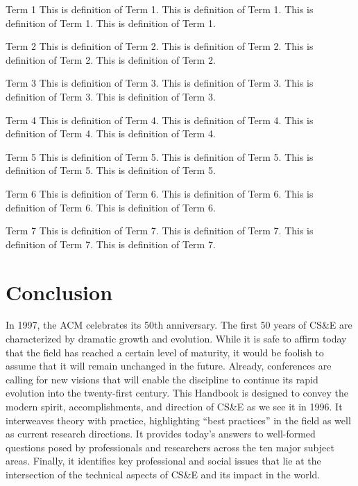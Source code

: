 \begin{gloss}
\item[Term 1]
This is definition of Term 1.
This is definition of Term 1.
This is definition of Term 1.
This is definition of Term 1.
\item[Term 2]
This is definition of Term 2.
This is definition of Term 2.
This is definition of Term 2.
This is definition of Term 2.
\item[Term 3]
This is definition of Term 3.
This is definition of Term 3.
This is definition of Term 3.
This is definition of Term 3.
\item[Term 4]
This is definition of Term 4.
This is definition of Term 4.
This is definition of Term 4.
This is definition of Term 4.
\item[Term 5]
This is definition of Term 5.
This is definition of Term 5.
This is definition of Term 5.
This is definition of Term 5.
\item[Term 6]
This is definition of Term 6.
This is definition of Term 6.
This is definition of Term 6.
This is definition of Term 6.
\item[Term 7]
This is definition of Term 7.
This is definition of Term 7.
This is definition of Term 7.
This is definition of Term 7.
\end{gloss}

\section{Conclusion}

\noindent 
In 1997, the ACM celebrates its 50th anniversary. The first 50
years of CS\&E are characterized by dramatic growth and
evolution. While it is safe to affirm today that the field has
reached a certain level of maturity, it would be foolish to
assume that it will remain unchanged in the future. Already,
conferences are calling for new visions that will enable the
discipline to continue its rapid evolution into the twenty-first
century. This Handbook is designed to convey the modern spirit,
accomplishments, and direction of CS\&E as we see it in 1996. It
interweaves theory with practice, highlighting ``best practices''
in the field as well as current research directions. It provides
today's answers to well-formed questions posed by professionals
and researchers across the ten major subject areas. Finally, it
identifies key professional and social issues that lie at the
intersection of the technical aspects of CS\&E and its impact in
the world.


